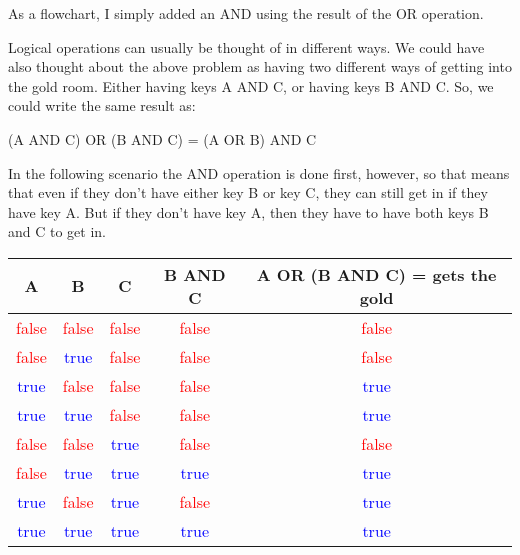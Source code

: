 As a flowchart, I simply added an AND using the result of the OR operation.

\begin{center} \end{center}

Logical operations can usually be thought of in different ways. We could have also thought about the above problem as having two different ways of getting into the gold room. Either having keys A AND C, or having keys B AND C. So, we could write the same result as:\\

\begin{center}
	(A AND C) OR (B AND C) = (A OR B) AND C
\end{center}

In the following scenario the AND operation is done first, however, so that means that even if they don't have either key B or key C, they can still get in if they have key A. But if they don't have key A, then they have to have both keys B and C to get in.\\

\begin{center} \end{center}

\begin{center}
	\begin{tabular}{c | c | c | c | c}
		A & B & C & B AND C & A OR (B AND C) = gets the gold\\ \hline
		\textcolor{red}{false} & \textcolor{red}{false} & \textcolor{red}{false} & \textcolor{red}{false} & \textcolor{red}{false}\\ \hline
		\textcolor{red}{false} & \textcolor{blue}{true} & \textcolor{red}{false} & \textcolor{red}{false} & \textcolor{red}{false}\\ \hline
		\textcolor{blue}{true} & \textcolor{red}{false} & \textcolor{red}{false} & \textcolor{red}{false} & \textcolor{blue}{true}\\ \hline
		\textcolor{blue}{true} & \textcolor{blue}{true} & \textcolor{red}{false} & \textcolor{red}{false} & \textcolor{blue}{true}\\ \hline

		\textcolor{red}{false} & \textcolor{red}{false} & \textcolor{blue}{true} & \textcolor{red}{false} & \textcolor{red}{false}\\ \hline
		\textcolor{red}{false} & \textcolor{blue}{true} & \textcolor{blue}{true} & \textcolor{blue}{true} & \textcolor{blue}{true}\\ \hline
		\textcolor{blue}{true} & \textcolor{red}{false} & \textcolor{blue}{true} & \textcolor{red}{false} & \textcolor{blue}{true}\\ \hline
		\textcolor{blue}{true} & \textcolor{blue}{true} & \textcolor{blue}{true} & \textcolor{blue}{true} & \textcolor{blue}{true}\\ \hline
	\end{tabular}
\end{center}

